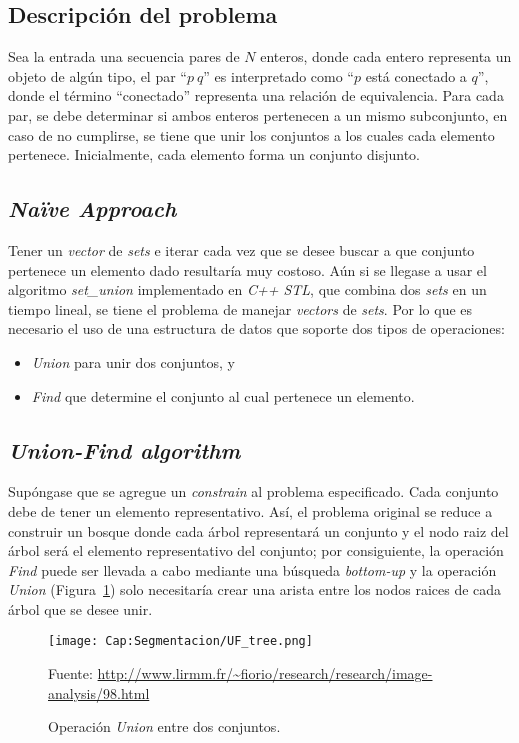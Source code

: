 \subsection{Descripción del problema}
Sea la entrada una secuencia pares de $N$ enteros, donde cada entero 
representa un objeto de algún tipo, el par ``$p~q$'' es interpretado como 
``$p$ está conectado a $q$'', donde el término ``conectado'' representa una 
relación de equivalencia. Para cada par, se debe determinar si ambos enteros
pertenecen a un mismo subconjunto, en caso de no cumplirse, se tiene que unir 
los conjuntos a los cuales cada elemento pertenece. Inicialmente, cada 
elemento forma un conjunto disjunto.

\subsection{\textit{Naïve Approach}}
Tener un \textit{vector} de \textit{sets} e iterar cada vez que se desee
buscar a que conjunto pertenece un elemento dado resultaría muy costoso. Aún 
si se llegase a usar el algoritmo \textit{set\_union} implementado en 
\textit{C++ STL}, que combina dos \textit{sets} en un tiempo lineal, se tiene 
el problema de manejar \textit{vectors} de \textit{sets}. Por lo que es 
necesario el uso de una estructura de datos que soporte dos tipos de 
operaciones:
\begin{itemize}
	\item \textit{Union} para unir dos conjuntos, y
	\item \textit{Find} que determine el conjunto al cual pertenece un elemento.
\end{itemize}

\subsection{\textit{Union-Find algorithm}}
Supóngase que se agregue un \textit{constrain} al problema especificado. Cada
conjunto debe de tener un elemento representativo. 
Así, el problema original se reduce a construir un bosque donde cada árbol 
representará un conjunto y el nodo raiz del árbol será el elemento 
representativo del conjunto; por consiguiente, la operación \textit{Find} 
puede ser llevada a cabo mediante una búsqueda \textit{bottom-up} y la 
operación \textit{Union} (Figura~\ref{fig:cap-segmentacion:UF_tree}) solo 
necesitaría crear una arista entre los nodos raices de cada árbol que se
desee unir.\cite{Wayne:2011:Alg}

\begin{figure}[h!]
	\centering
	\texttt{[image: Cap:Segmentacion/UF\_tree.png]}
	\caption{Operación \textit{Union} entre dos conjuntos.}\tiny{Fuente: 
	\url{http://www.lirmm.fr/~fiorio/research/research/image-analysis/98.html}}
	\label{fig:cap-segmentacion:UF_tree}
\end{figure}

